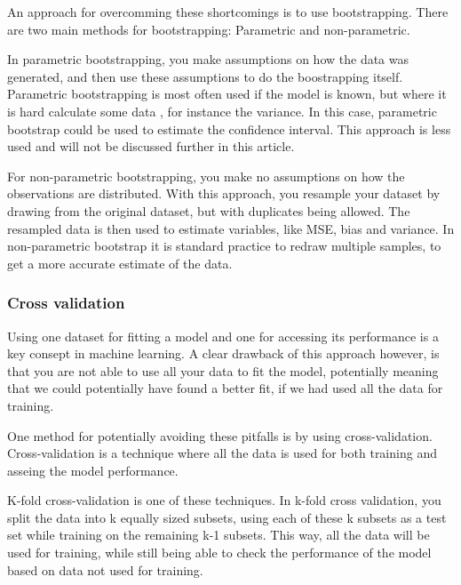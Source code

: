 \documentclass[12pt]{article}
\begin{document}
An approach for overcomming these shortcomings is to use bootstrapping. There are two main methods for bootstrapping: Parametric and non-parametric.

In parametric bootstrapping, you make assumptions on how the data was generated, and then use these assumptions to do the boostrapping itself.
Parametric bootstrapping is most often used if the model is known, but where it is hard calculate some data %
, for instance the variance.
In this case, parametric bootstrap could be used to estimate the confidence interval.
This approach is less used and will not be discussed further in this article. %

For non-parametric bootstrapping, you make no assumptions on how the observations are distributed.
With this approach, you resample your dataset by drawing from the original dataset, but with duplicates being allowed.
The resampled data is then used to estimate variables, like MSE, bias and variance.
In non-parametric bootstrap it is standard practice to redraw multiple samples, to get a more accurate estimate of the data.



\subsubsection{Cross validation}

Using one dataset for fitting a model and one for accessing its performance is a key consept in machine learning.
A clear drawback of this approach however, is that you are not able to use all your data to fit the model, potentially meaning that we could potentially have found a better fit, if we had used all the data for training.

One method for potentially avoiding these pitfalls is by using cross-validation. Cross-validation is a technique where all the data is used for both training and asseing the model performance.

K-fold cross-validation is one of these techniques.
In k-fold cross validation, you split the data into k equally sized subsets, using each of these k subsets as a test set while training on the remaining k-1 subsets.
This way, all the data will be used for training, while still being able to check the performance of the model based on data not used for training.
\end{document}
